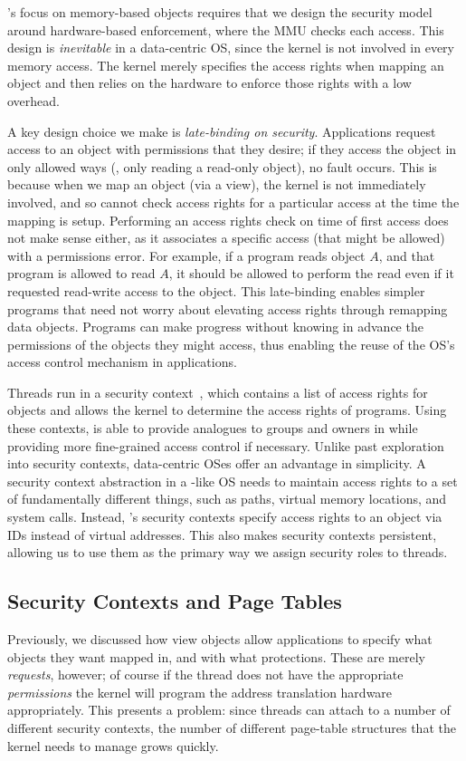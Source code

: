 \Twizzler's focus on memory-based objects requires that we design the security model around
hardware-based enforcement, where the MMU checks
each access. This design is \emph{inevitable} in a data-centric OS, since the
kernel is not involved in every memory access. The kernel merely specifies the access rights when
mapping an object and then relies on the hardware to enforce those rights with a low overhead.

A key design choice we make is \emph{late-binding on security}. Applications
request access to an object with permissions that they desire;
if they access the object in only allowed ways (\eg, only reading a read-only
object), no fault occurs.
This is because when we map an object (via a view), the kernel is not immediately involved, and so
cannot check access rights for a particular access at the time the mapping is setup. Performing an access rights check on
time of first access does not make sense either, as it associates a specific access (that
might be allowed) with a permissions error. For example, if a program reads object $A$, and that program is
allowed to read $A$, it should be allowed to perform the read even if it requested read-write access
to the object.
This late-binding enables simpler programs that need not worry about
elevating access rights through remapping data objects. Programs can make progress without
knowing in advance the permissions of the objects they might access, thus enabling the reuse of the
OS's access control mechanism in applications.

Threads run in a security context~\cite{lwc,bittau:nsdi08,elhajj:asplos16}, which
contains a list of access rights for objects and allows the kernel to determine the access rights of
programs. Using these contexts, \Twizzler is able to provide
analogues to groups and owners in \unix while providing more fine-grained access control if
necessary. Unlike past exploration into security contexts, data-centric OSes offer an
advantage in simplicity. A security context abstraction in a \unix-like OS needs to
maintain access rights to a set of fundamentally different things, such as paths, virtual memory
locations, and system calls. Instead, \Twizzler's security contexts specify access rights to an object
via IDs instead of virtual addresses.
This also makes security contexts persistent, allowing us to use them as
the primary way we assign security roles to threads.


\subsection{Security Contexts and Page Tables}
\label{sec:secimpl}
Previously, we discussed how view objects allow applications to specify what objects they
want mapped in, and with what protections. These are merely \emph{requests}, however; of course if
the thread does not have the appropriate \emph{permissions} the kernel will program the address
translation hardware appropriately. This presents a problem: since threads can attach to a number of
different security contexts, the number of different page-table structures that the kernel needs to
manage grows quickly.

